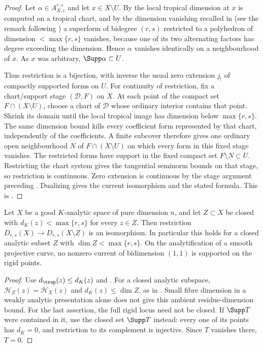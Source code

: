 \begin{proof}
Let $\alpha\in A_{X,c}^{r,s}$ and let $x\in X\setminus U$.  By
 the local tropical dimension at $x$
is computed on a tropical chart, and by the dimension vanishing recalled in
 (see the remark following
) a superform of bidegree $(r,s)$ restricted to a
polyhedron of dimension $<\max\{r,s\}$ vanishes, because one of its two
alternating factors has degree exceeding the dimension.  Hence $\alpha$
vanishes identically on a neighbourhood of $x$.  As $x$ was arbitrary,
$\Supp\alpha\subset U$.

Thus restriction is a bijection, with inverse the usual zero extension
$j_!$ of compactly supported forms on $U$. For continuity of restriction,
fix a chart/support stage $(\mathscr D,F)$ on $X$. At each point of the
compact set $F\cap(X\setminus U)$, choose a chart of $\mathscr D$
whose ordinary interior contains that point. Shrink its domain until
the local tropical image has dimension below $\max\{r,s\}$. The same
dimension bound kills every coefficient form represented by that chart,
independently of the coefficients. A finite subcover therefore gives
one ordinary open neighbourhood $N$ of $F\cap(X\setminus U)$ on which
every form in this fixed stage vanishes. The restricted forms have
support in the fixed compact set $F\setminus N\subset U$.
Restricting the chart system gives the tangential seminorm bounds on that
stage, so restriction is continuous. Zero extension is continuous by
the stage argument preceding .
Dualizing gives the current isomorphism and the stated formula.
This is \cite[Lemma~7.1.13 and Lemma~6.4.5]{CLD25}.
\end{proof}

\begin{corollary}
\label{cor:ch14-rigid-invisible}
Let $X$ be a good $K$-analytic space of pure dimension $n$, and let
$Z\subset X$ be closed with $d_K(z)<\max\{r,s\}$ for every $z\in Z$.
Then restriction $D_{r,s}(X)\to D_{r,s}(X\setminus Z)$ is an
isomorphism. In particular this holds for a closed analytic subset
$Z$ with $\dim Z<\max\{r,s\}$. On the analytification of a smooth
projective curve, no nonzero current of bidimension $(1,1)$ is supported
on the rigid points.
\end{corollary}

\begin{proof}
Use $d_{\trop}(z)\le d_K(z)$ and
. For a closed analytic subspace,
$\mathcal H_Z(z)=\mathcal H_X(z)$ and $d_K(z)\le\dim Z$, as in
\cite[Proposition~15.2.1(b)]{CLD25}. Small fibre dimension in a weakly
analytic presentation alone does not give this ambient residue-dimension
bound.
For the last assertion, the full rigid locus need not be closed. If
$\Supp T$ were contained in it, use the closed set $\Supp T$ instead:
every one of its points has $d_K=0$, and restriction to its complement
is injective. Since $T$ vanishes there, $T=0$.
\end{proof}

